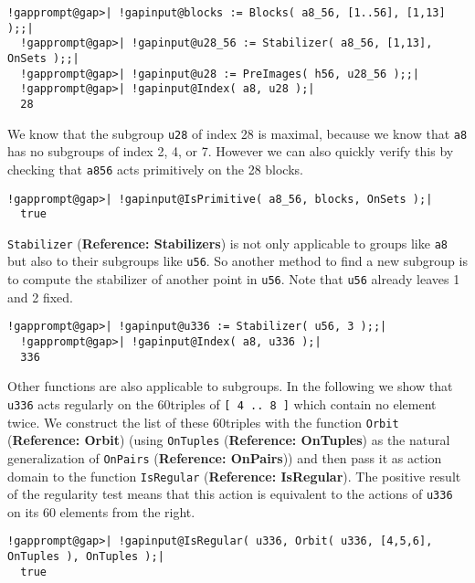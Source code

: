\documentclass[a4paper,11pt]{report}
\begin{document}
{{ 
\begin{Verbatim}[commandchars=!@|,fontsize=\small,frame=single,label=Example]
  !gapprompt@gap>| !gapinput@blocks := Blocks( a8_56, [1..56], [1,13] );;|
  !gapprompt@gap>| !gapinput@u28_56 := Stabilizer( a8_56, [1,13], OnSets );;|
  !gapprompt@gap>| !gapinput@u28 := PreImages( h56, u28_56 );;|
  !gapprompt@gap>| !gapinput@Index( a8, u28 );|
  28
\end{Verbatim}
 

 We know that the subgroup \texttt{u28} of index 28 is maximal, because we know that \texttt{a8} has no subgroups of index 2, 4, or 7. However we can also quickly verify this
by checking that \texttt{a8{\textunderscore}56} acts primitively on the 28 blocks. 

 
\begin{Verbatim}[commandchars=!@|,fontsize=\small,frame=single,label=Example]
  !gapprompt@gap>| !gapinput@IsPrimitive( a8_56, blocks, OnSets );|
  true
\end{Verbatim}
 

 \texttt{Stabilizer} (\textbf{Reference: Stabilizers}) is not only applicable to groups like \texttt{a8} but also to their subgroups like \texttt{u56}. So another method to find a new subgroup is to compute the stabilizer of
another point in \texttt{u56}. Note that \texttt{u56} already leaves 1 and 2 fixed. 

 
\begin{Verbatim}[commandchars=!@|,fontsize=\small,frame=single,label=Example]
  !gapprompt@gap>| !gapinput@u336 := Stabilizer( u56, 3 );;|
  !gapprompt@gap>| !gapinput@Index( a8, u336 );|
  336
\end{Verbatim}
 

 Other functions are also applicable to subgroups. In the following we show
that \texttt{u336} acts regularly on the 60{\nobreakspace}triples of \texttt{[ 4 .. 8 ]} which contain no element twice. We construct the list of these
60{\nobreakspace}triples with the function \texttt{Orbit} (\textbf{Reference: Orbit}) (using \texttt{OnTuples} (\textbf{Reference: OnTuples}) as the natural generalization of \texttt{OnPairs} (\textbf{Reference: OnPairs})) and then pass it as action domain to the function \texttt{IsRegular} (\textbf{Reference: IsRegular}). The positive result of the regularity test means that this action is
equivalent to the actions of \texttt{u336} on its 60 elements from the right. 

 
\begin{Verbatim}[commandchars=!@|,fontsize=\small,frame=single,label=Example]
  !gapprompt@gap>| !gapinput@IsRegular( u336, Orbit( u336, [4,5,6], OnTuples ), OnTuples );|
  true
\end{Verbatim}
 

}}
\end{document}
